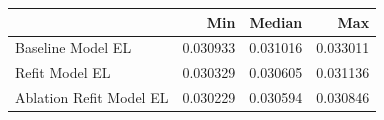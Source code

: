 \begin{tabular}{lrrr}
\toprule
 & Min & Median & Max \\
\midrule
Baseline Model EL & 0.030933 & 0.031016 & 0.033011 \\
Refit Model EL & 0.030329 & 0.030605 & 0.031136 \\
Ablation Refit Model EL & 0.030229 & 0.030594 & 0.030846 \\
\bottomrule
\end{tabular}
